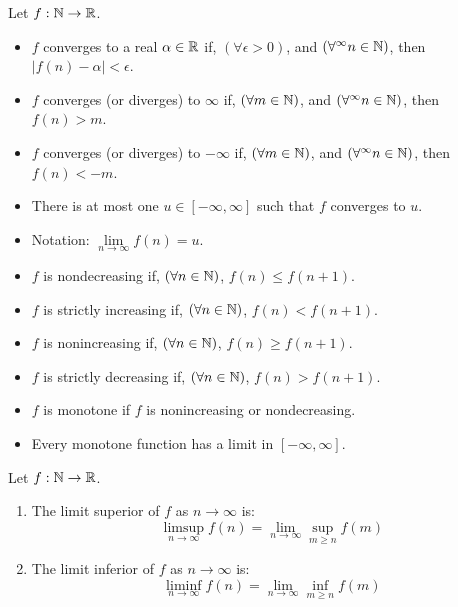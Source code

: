 \documentclass[../main.tex]{subfiles}
\begin{document}
Let $f:\mathbb{N} \rightarrow \mathbb{R}$.
\begin{itemize}
    \item $f$ converges to a real $\alpha \in \mathbb{R}$ if, $(\forall \epsilon > 0)$,
        and $(\forall^{\infty} n \in \mathbb{N})$, then $| f(n) - \alpha | < \epsilon$.
    \item $f$ converges (or diverges) to $\infty$ if, $(\forall m \in \mathbb{N})$,
        and $(\forall^{\infty} n \in \mathbb{N})$, then $f(n) > m$.
    \item $f$ converges (or diverges) to $-\infty$ if, $(\forall m \in \mathbb{N})$,
        and $(\forall^{\infty} n \in \mathbb{N})$, then $f(n) < -m$.
    \item There is at most one $u \in [-\infty, \infty]$ such that $f$ converges
        to $u$.
    \item Notation: $\lim\limits_{n \rightarrow \infty} f(n) = u$.
    \item $f$ is nondecreasing if, $(\forall n \in \mathbb{N})$, $f(n) \leq f(n+1)$.
    \item $f$ is strictly increasing if, $(\forall n \in \mathbb{N})$, $f(n) < f(n+1)$.
    \item $f$ is nonincreasing if, $(\forall n \in \mathbb{N})$, $f(n) \geq f(n+1)$.
    \item $f$ is strictly decreasing if, $(\forall n \in \mathbb{N})$, $f(n) > f(n+1)$.
    \item $f$ is monotone if $f$ is nonincreasing or nondecreasing.
    \item Every monotone function has a limit in $[-\infty, \infty]$.
\end{itemize}

\begin{defn}
    Let $f:\mathbb{N} \rightarrow \mathbb{R}$.
    \begin{enumerate}
        \item The limit superior of $f$ as $n \rightarrow \infty$ is:
            \begin{equation*}
                \limsup\limits_{n \rightarrow \infty} f(n) = \lim\limits_{n \rightarrow \infty} \sup\limits_{m \geq n} f( m )
            \end{equation*}
        \item The limit inferior of $f$ as $n \rightarrow \infty$ is:
            \begin{equation*}
                \liminf\limits_{n \rightarrow \infty} f(n) = \lim\limits_{n \rightarrow \infty} \inf\limits_{m \geq n} f( m )
            \end{equation*}
    \end{enumerate}
\end{defn}
\end{document}
